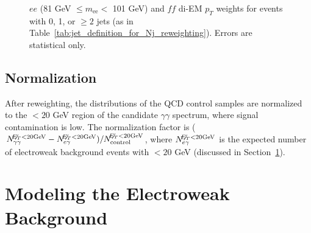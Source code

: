 \documentclass[dissertation.tex]{subfiles}
\begin{document}
\begin{figure}
	\hspace{1cm}
	\caption{$ee$ (81 GeV $\leq m_{\mathrm{ee}} <$ 101 GeV) and $\mathit{ff}$ di-EM $p_{T}$ weights for events with 0, 1, or $\geq 2$ jets (as in Table~\ref{tab:jet_definition_for_Nj_reweighting}).  Errors are statistical only.}
	\label{fig:dijet_pT_weights}
\end{figure}

\subsection{Normalization}
\label{sec:Normalization}

After reweighting, the \MET distributions of the QCD control samples are normalized to the \MET $< 20$ GeV region of the candidate $\gamma\gamma$ \MET spectrum, where signal contamination is low.  The normalization factor is ($N_{\gamma\gamma}^{\not\!\! E_{T} < 20 \mathrm{GeV}} - N_{e\gamma}^{\not\!\! E_{T} < 20 \mathrm{GeV}})/N_{\mathrm{control}}^{\not\!\! E_{T} < 20 \mathrm{GeV}}$, where $N_{e\gamma}^{\not\!\! E_{T} < 20 \mathrm{GeV}}$ is the expected number of electroweak background events with \MET $< 20$ GeV (discussed in Section~\ref{sec:Modeling the Electroweak Background}).

\section{Modeling the Electroweak Background}
\label{sec:Modeling the Electroweak Background}
\end{document}
